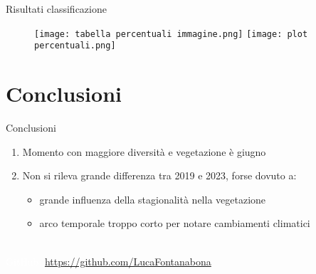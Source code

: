 \documentclass{beamer} %
\begin{document}
\begin{frame}{Risultati classificazione}
	\begin{figure}
    		\centering
    		\texttt{[image: tabella percentuali immagine.png]}
    		\texttt{[image: plot percentuali.png]}        
    		\label{fig:enter-label}
	\end{figure}
\end{frame}


\section{Conclusioni}


\begin{frame}{Conclusioni}
	\begin{enumerate}
        	\item Momento con maggiore diversità e vegetazione è giugno 
        	\item \pause Non si rileva grande differenza tra 2019 e 2023, forse dovuto a: \\
       			\begin{itemize}
            			\item \pause grande influenza della stagionalità nella vegetazione 
            			\item \pause arco temporale troppo corto per notare cambiamenti climatici
        		\end{itemize}
   	\end{enumerate}
\end{frame}


        
\begin{frame}{}
\bigskip %
\bigskip
\bigskip
\bigskip
\bigskip
\bigskip
\bigskip
\bigskip
\bigskip
\bigskip
\bigskip
\bigskip
\bigskip
\bigskip
\bigskip
\centering {\textcolor{white}{\Huge Grazie per l'attenzione!}} \\
\smallskip
\textcolor{white}{GitHub: \url{https://github.com/LucaFontanabona}}
\end{frame}
\end{document}

